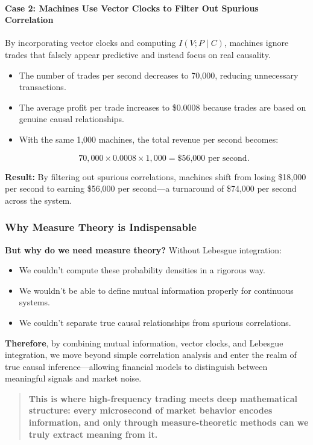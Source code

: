 \paragraph{Case 2: Machines Use Vector Clocks to Filter Out Spurious Correlation}

By incorporating vector clocks and computing \(I(V; P \mid C)\), machines ignore trades that falsely appear predictive and instead focus on real causality.

\begin{itemize}
    \item The number of trades per second decreases to 70,000, reducing unnecessary transactions.
    \item The average profit per trade increases to \$0.0008 because trades are based on genuine causal relationships.
    \item With the same 1,000 machines, the total revenue per second becomes:

    \[
    70,000 \times 0.0008 \times 1,000 = \text{\$56,000 per second}.
    \]

\end{itemize}

\textbf{Result:} By filtering out spurious correlations, machines shift from losing \$18,000 per second to earning \$56,000 per second—a turnaround of \$74,000 per second across the system.

\subsubsection*{Why Measure Theory is Indispensable}

\textbf{But why do we need measure theory?} Without Lebesgue integration:
\begin{itemize}
    \item We couldn’t compute these probability densities in a rigorous way.
    \item We wouldn’t be able to define mutual information properly for continuous systems.
    \item We couldn’t separate true causal relationships from spurious correlations.
\end{itemize}

\textbf{Therefore}, by combining mutual information, vector clocks, and Lebesgue integration, we move beyond simple correlation analysis and enter the realm of true causal inference—allowing financial models to distinguish between meaningful signals and market noise.

\begin{quote}
\textbf{This is where high-frequency trading meets deep mathematical structure: every microsecond of market behavior encodes information, and only through measure-theoretic methods can we truly extract meaning from it.}
\end{quote}
